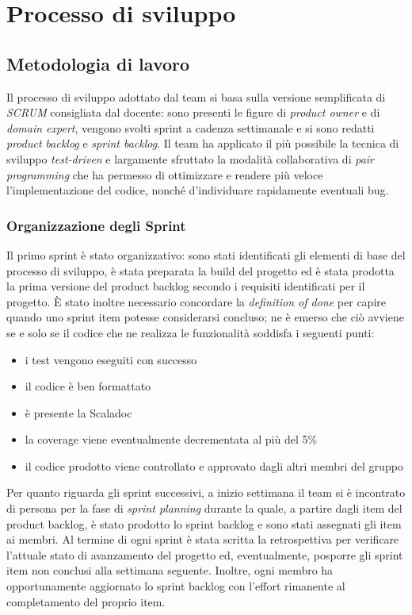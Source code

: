 \chapter{Processo di sviluppo}\label{ch:processo-di-sviluppo}
\section{Metodologia di lavoro}\label{sec:metodologia-di-lavoro}
Il processo di sviluppo adottato dal team si basa sulla versione semplificata di \textit{SCRUM} consigliata dal docente:
sono presenti le figure di \textit{product owner} e di \textit{domain expert}, vengono svolti sprint a cadenza
settimanale e si sono redatti \textit{product backlog} e \textit{sprint backlog}.
Il team ha applicato il più possibile la tecnica di sviluppo \textit{test-driven} e largamente sfruttato la modalità
collaborativa di \textit{pair programming} che ha permesso di ottimizzare e rendere più veloce l'implementazione del
codice, nonché d'individuare rapidamente eventuali bug.

\subsection{Organizzazione degli Sprint}\label{subsec:organizzazione-sprint}
Il primo sprint è stato organizzativo: sono stati identificati gli elementi di base del processo di sviluppo, è stata
preparata la build del progetto ed è stata prodotta la prima versione del product backlog secondo i requisiti
identificati per il progetto.
È stato inoltre necessario concordare la \textit{definition of done} per capire quando uno sprint item potesse
considerarsi concluso;
ne è emerso che ciò avviene se e solo se il codice che ne realizza le funzionalità soddisfa i seguenti punti:
\begin{itemize}
    \item i test vengono eseguiti con successo
    \item il codice è ben formattato
    \item è presente la Scaladoc
    \item la coverage viene eventualmente decrementata al più del 5\%
    \item il codice prodotto viene controllato e approvato dagli altri membri del gruppo
\end{itemize}
Per quanto riguarda gli sprint successivi, a inizio settimana il team si è incontrato di persona per la fase di
\textit{sprint planning} durante la quale, a partire dagli item del product backlog, è stato prodotto lo
sprint backlog e sono stati assegnati gli item ai membri.
Al termine di ogni sprint è stata scritta la retrospettiva per verificare l'attuale stato di avanzamento del progetto
ed, eventualmente, posporre gli sprint item non conclusi alla settimana seguente.
Inoltre, ogni membro ha opportunamente aggiornato lo sprint backlog con l'effort rimanente al completamento del
proprio item.

